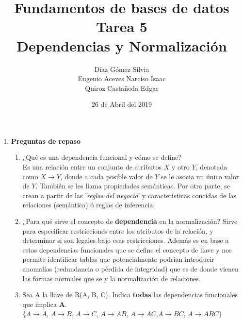 \documentclass{article}
\begin{document}
    \title{
        Fundamentos de bases de datos \\
        Tarea 5 \\
        Dependencias y Normalización
    }
    \author{
        Díaz Gómez Silvia \\
        Eugenio Aceves Narciso Isaac \\
        Quiroz Castañeda Edgar
    }
    \date {
        26 de Abril del 2019    
    }
    \maketitle
    
    \begin{enumerate}
    	
    
    \item { \textbf{Preguntas de repaso}}
    \begin{enumerate}[label = \alph*.]
        \item ¿Qué es una dependencia funcional y cómo se define?\\
        Es una relación entre un conjunto de atributos $X$ y
        otro $Y$, denotada como $X \rightarrow Y$, donde a cada
        posible valor de $Y$ se le asocia un único valor de $Y$.
        También se les llama propiedades semánticas.
        Por otra parte, se crean a partir de las '\textit{reglas del negocio}' y 
        características concidas de las relaciones (semántica) ó reglas de inferencia.
        
        \item ¿Para qué sirve el concepto de \textbf{dependencia} en la normalización?
        Sirve para especificar restricciones entre los atributos
        de la relación, y determinar si son legales bajo esas
        restricciones. Además es en base a estas dependencias
        funcionales que se define el concepto de llave y nos permite 
        identificar tablas que potencialmente podrían introducir anomalías
        (redundancia o pérdida de integridad) que es de donde vienen
        las formas normales que se y la normalización de relaciones.
        
        \item Sea A la llave de R(A, B, C). Indica \textbf{todas} las dependencias funcionales que implica \textbf{A}. \\
        $\{A \rightarrow A$, $A \rightarrow B$, 
        $A \rightarrow C$, $A \rightarrow AB$,
        $A \rightarrow AC$,$A \rightarrow BC$, 
        $A \rightarrow ABC\}$\\
        

\end{enumerate}
\end{enumerate}
\end{document}
